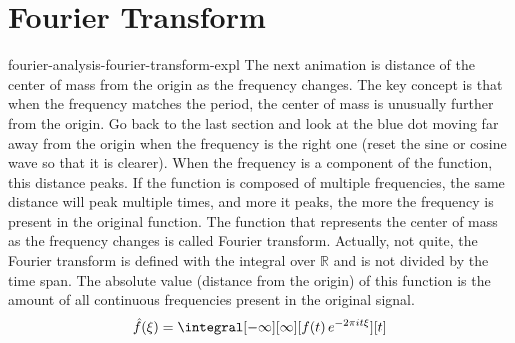 \documentclass[preview]{standalone}
\begin{document}
\genpage

\section{Fourier Transform}

\begin{snippet}{fourier-analysis-fourier-transform-expl}
    The next animation is distance of the center of mass from the origin as the frequency changes.
    The key concept is that when the frequency matches the period, the center of mass is unusually further from the origin.
    Go back to the last section and look at the blue dot moving far away from the origin when the frequency is the right one
    (reset the sine or cosine wave so that it is clearer). When the frequency is a component of the function, this distance peaks.
    If the function is composed of multiple frequencies, the same distance will peak multiple times, and more it peaks,
    the more the frequency is present in the original function.
    The function that represents the center of mass as the frequency changes is called Fourier transform.
    Actually, not quite, the Fourier transform is defined with the integral over \(\mathbb{R}\)
    and is not divided by the time span. The absolute value (distance from the origin) of this function
    is the amount of all continuous frequencies present in the original signal.
    \[
        \hat{f}(\xi)=\integral[-\infty][\infty][f(t)\,e^{-2\pi it\xi}][t]
    \]
\end{snippet}

\end{document}
